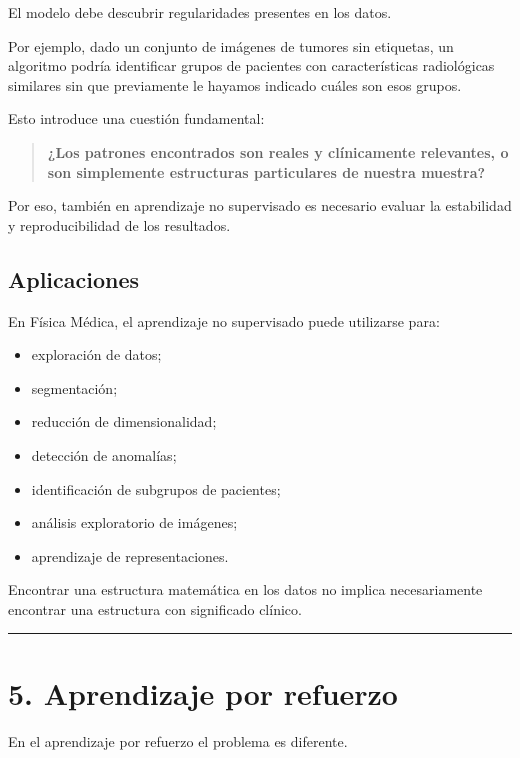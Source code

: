 \documentclass[
  letterpaper,
  DIV=11,
  numbers=noendperiod]{scrartcl}
\providecommand{\tightlist}{%
  \setlength{\itemsep}{0pt}\setlength{\parskip}{0pt}}
\begin{document}
El modelo debe descubrir regularidades presentes en los datos.

Por ejemplo, dado un conjunto de imágenes de tumores sin etiquetas, un
algoritmo podría identificar grupos de pacientes con características
radiológicas similares sin que previamente le hayamos indicado cuáles
son esos grupos.

Esto introduce una cuestión fundamental:

\begin{quote}
\textbf{¿Los patrones encontrados son reales y clínicamente relevantes,
o son simplemente estructuras particulares de nuestra muestra?}
\end{quote}

Por eso, también en aprendizaje no supervisado es necesario evaluar la
estabilidad y reproducibilidad de los resultados.

\subsection{Aplicaciones}\label{aplicaciones}

En Física Médica, el aprendizaje no supervisado puede utilizarse para:

\begin{itemize}
\tightlist
\item
  exploración de datos;
\item
  segmentación;
\item
  reducción de dimensionalidad;
\item
  detección de anomalías;
\item
  identificación de subgrupos de pacientes;
\item
  análisis exploratorio de imágenes;
\item
  aprendizaje de representaciones.
\end{itemize}

Encontrar una estructura matemática en los datos no implica
necesariamente encontrar una estructura con significado clínico.

\begin{center}\rule{0.5\linewidth}{0.5pt}\end{center}

\section{5. Aprendizaje por refuerzo}\label{aprendizaje-por-refuerzo}

En el aprendizaje por refuerzo el problema es diferente.
\end{document}
